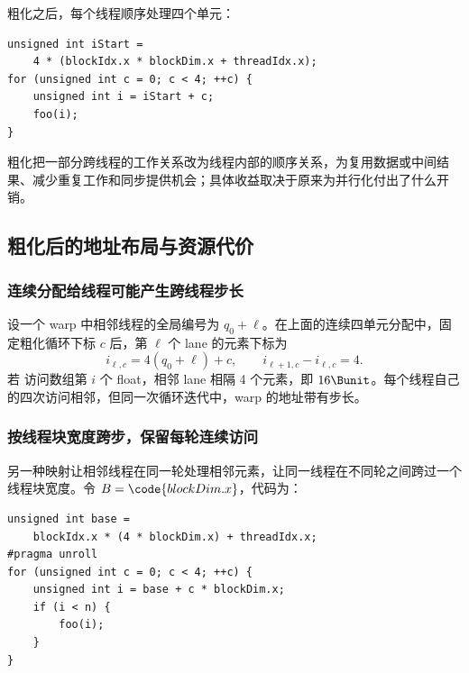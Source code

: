 \par\noindent\begin{minipage}{\linewidth}
粗化之后，每个线程顺序处理四个单元：

\begin{lstlisting}[caption={连续四单元分配给同一线程。有效下标范围在该概念片段中作为前提。}]
unsigned int iStart =
    4 * (blockIdx.x * blockDim.x + threadIdx.x);
for (unsigned int c = 0; c < 4; ++c) {
    unsigned int i = iStart + c;
    foo(i);
}
\end{lstlisting}
\end{minipage}\par

粗化把一部分跨线程的工作关系改为线程内部的顺序关系，为复用数据或中间结果、减少重复工作和同步提供机会；具体收益取决于原来为并行化付出了什么开销。

\subsection{粗化后的地址布局与资源代价}
\subsubsection{连续分配给线程可能产生跨线程步长}
设一个 warp 中相邻线程的全局编号为 $q_0+\ell$。在上面的连续四单元分配中，固定粗化循环下标 $c$ 后，第 $\ell$ 个 lane 的元素下标为
\begin{equation}
  i_{\ell,c}=4(q_0+\ell)+c,
  \qquad i_{\ell+1,c}-i_{\ell,c}=4.
\end{equation}
若  访问数组第 $i$ 个 float，相邻 lane 相隔 4 个元素，即 $16\Bunit$。每个线程自己的四次访问相邻，但同一次循环迭代中，warp 的地址带有步长。

\subsubsection{按线程块宽度跨步，保留每轮连续访问}
\par\noindent\begin{minipage}{\linewidth}
另一种映射让相邻线程在同一轮处理相邻元素，让同一线程在不同轮之间跨过一个线程块宽度。令 $B=\code{blockDim.x}$，代码为：

\begin{lstlisting}[caption={保持每次迭代内 warp 连续访问的四倍粗化。}]
unsigned int base =
    blockIdx.x * (4 * blockDim.x) + threadIdx.x;
#pragma unroll
for (unsigned int c = 0; c < 4; ++c) {
    unsigned int i = base + c * blockDim.x;
    if (i < n) {
        foo(i);
    }
}
\end{lstlisting}
\end{minipage}\par

